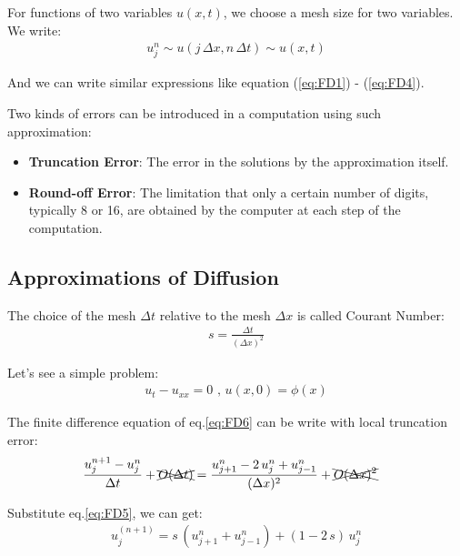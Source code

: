 \documentclass[../main.tex]{subfiles}
\begin{document}
For functions of two variables $u(x,t)$, we choose a mesh size for two variables. We write:
\begin{align*}
    u_j^n \sim u(j \, \Delta x, n \, \Delta t) \sim u(x,t)
\end{align*}

And we can write similar expressions like equation (\ref{eq:FD1}) - (\ref{eq:FD4}).

Two kinds of errors can be introduced in a computation using such approximation:
\begin{itemize}
  \item \textbf{Truncation Error}: The error in the solutions by the approximation itself.
  \item \textbf{Round-off Error}: The limitation that only a certain number of digits, typically 8 or 16, are obtained by the computer at each step of the computation.
\end{itemize}






\subsection{Approximations of Diffusion}

The choice of the mesh $\Delta t$ relative to the mesh $\Delta x$ is called Courant Number:
\begin{align}
    s = \frac{\Delta t}{(\Delta x)^2} \label{eq:FD5}
\end{align}

Let's see a simple problem:
\begin{align}
    u_t - u_{xx} = 0 \text{ , } u(x,0) = \phi(x) \label{eq:FD6}
\end{align}

The finite difference equation of eq.\ref{eq:FD6} can be write with local truncation error:
\begin{align}
    \frac{u_j^{n+1} - u_j^{n}}{\Delta t} + \xcancel{O(\Delta t)} & = \frac{u_{j+1}^n - 2 \, u_j^n + u_{j-1}^n}{(\Delta x)^2} + \xcancel{O(\Delta x)^2} \label{eq:FD7}
\end{align}

Substitute eq.\ref{eq:FD5}, we can get:
\begin{align}
    u_j^{(n+1)} = s \, (u_{j+1}^n + u_{j-1}^n) + (1 - 2 \, s) \, u_j^n \label{eq:FD8}
\end{align}
\end{document}
